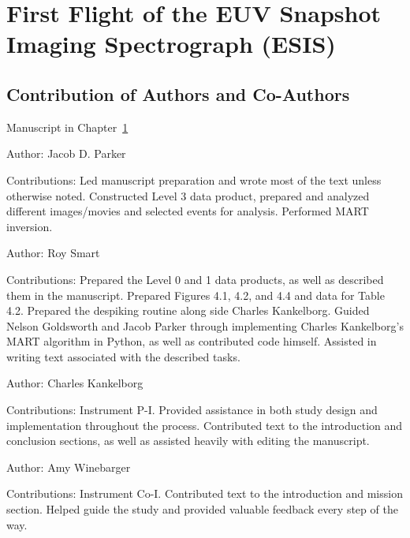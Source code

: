 
\chapter{First Flight of the EUV Snapshot Imaging Spectrograph (ESIS)}\label{CH:manuscript3}

\section{Contribution of Authors and Co-Authors}

Manuscript in Chapter~\ref{CH:manuscript3}  %

Author: Jacob D. Parker

\begin{singlespace}
	Contributions: Led manuscript preparation and wrote most of the text unless otherwise noted. Constructed Level 3 data product, prepared and analyzed different images/movies and selected events for analysis. Performed MART inversion.
\end{singlespace}

Author: Roy Smart

\begin{singlespace}
	Contributions: Prepared the Level 0 and 1 data products, as well as described them in the manuscript.  Prepared Figures 4.1, 4.2, and 4.4 and data for Table 4.2. Prepared the despiking routine along side Charles Kankelborg. Guided Nelson Goldsworth and Jacob Parker through implementing Charles Kankelborg's MART algorithm in Python, as well as contributed code himself. Assisted in writing text associated with the described tasks.
\end{singlespace}

Author: Charles Kankelborg

\begin{singlespace}
	Contributions: Instrument P-I. Provided assistance in both study design and implementation throughout the process. Contributed text to the introduction and conclusion sections, as well as assisted heavily with editing the manuscript.
\end{singlespace}

Author: Amy Winebarger

\begin{singlespace}
	Contributions: Instrument Co-I. Contributed text to the introduction and mission section.  Helped guide the study and provided valuable feedback every step of the way.
\end{singlespace}

